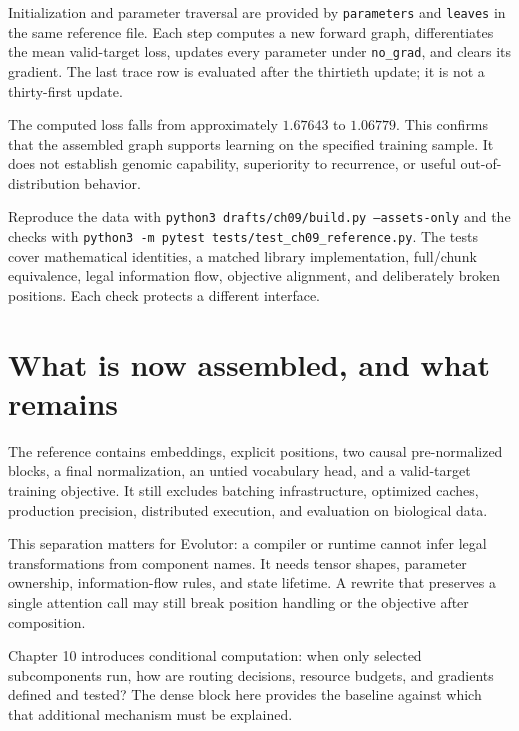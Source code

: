 Initialization and parameter traversal are provided by \texttt{parameters} and \texttt{leaves} in the same reference file. Each step computes a new forward graph, differentiates the mean valid-target loss, updates every parameter under \texttt{no\_grad}, and clears its gradient. The last trace row is evaluated after the thirtieth update; it is not a thirty-first update.

\begin{center}

\end{center}
The computed loss falls from approximately $1.67643$ to $1.06779$. This confirms that the assembled graph supports learning on the specified training sample. It does not establish genomic capability, superiority to recurrence, or useful out-of-distribution behavior.

Reproduce the data with \texttt{python3 drafts/ch09/build.py --assets-only} and the checks with \texttt{python3 -m pytest tests/test\_ch09\_reference.py}. The tests cover mathematical identities, a matched library implementation, full/chunk equivalence, legal information flow, objective alignment, and deliberately broken positions. Each check protects a different interface.

\section{What is now assembled, and what remains}
The reference contains embeddings, explicit positions, two causal pre-normalized blocks, a final normalization, an untied vocabulary head, and a valid-target training objective. It still excludes batching infrastructure, optimized caches, production precision, distributed execution, and evaluation on biological data.

This separation matters for Evolutor: a compiler or runtime cannot infer legal transformations from component names. It needs tensor shapes, parameter ownership, information-flow rules, and state lifetime. A rewrite that preserves a single attention call may still break position handling or the objective after composition.

Chapter 10 introduces conditional computation: when only selected subcomponents run, how are routing decisions, resource budgets, and gradients defined and tested? The dense block here provides the baseline against which that additional mechanism must be explained.

